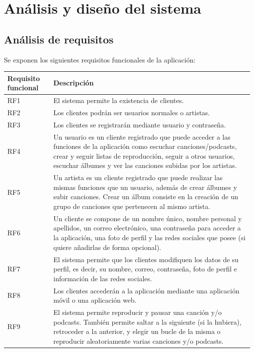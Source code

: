 \documentclass{article}
\begin{document}
\newpage
\section{Análisis y diseño del sistema}

\subsection{Análisis de requisitos}
Se exponen los siguientes requisitos funcionales de la aplicación:
\begin{table}[H]
	\begin{tabular}{p{4cm} p{10cm}}
		\hline
		\hline 
		\textbf{Requisito funcional}
		\vspace{0.5mm} & \textbf{Descripción} \\ 
		\hline
		\hline
		RF1
		& El sistema permite la existencia de clientes. \\ 
		\hline 
		RF2
		& Los clientes podrán ser usuarios normales o artistas. \\ 
		\hline
		RF3
		& Los clientes se registrarán mediante usuario y contraseña. \\ 
		\hline
		RF4
		& Un usuario es un cliente registrado que puede acceder a las funciones de la aplicación como escuchar canciones/podcasts, crear y seguir listas de reproducción, seguir a otros usuarios, escuchar álbumes y ver las canciones subidas por los artistas. \\ 
		\hline
		RF5
		& Un artista es un cliente registrado que puede realizar las mismas funciones que un usuario, además de crear álbumes y subir canciones. Crear un álbum consiste en la creación de un grupo de canciones que pertenecen al mismo artista. \\ 
		\hline
		RF6
		& Un cliente se compone de un nombre único, nombre personal y apellidos, un correo electrónico, una contraseña para acceder a la aplicación, una foto de perfil y las redes sociales que posee (si quiere añadirlas de forma opcional). \\ 
		\hline
		RF7
		& El sistema permite que los clientes modifiquen los datos de su perfil, es decir, su nombre, correo, contraseña, foto de perfil e información de las redes sociales. \\ 
		\hline
		RF8
		& Los clientes accederán a la aplicación mediante una aplicación móvil o una aplicación web. \\ 
		\hline
		RF9
		& El sistema permite reproducir y pausar una canción y/o podcasts. También permite saltar a la siguiente (si la hubiera), retroceder a la anterior, y elegir un bucle de la misma o reproducir aleatoriamente varias canciones y/o podcasts. \\ 

\end{tabular}
\end{table}
\end{document}
